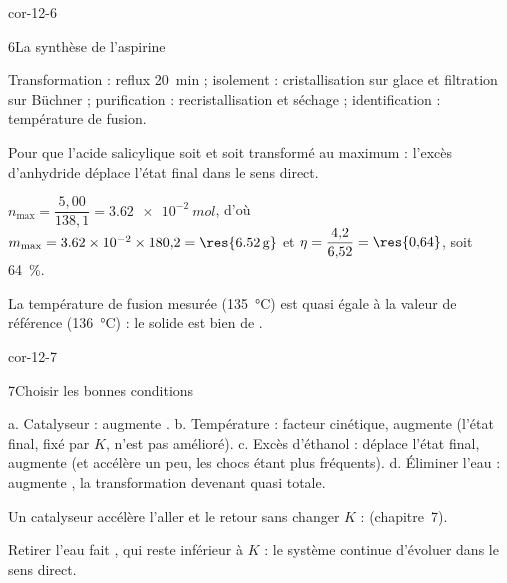 \begin{blocLivre}{cor-12-6}
\begin{corrige}{6}{La synthèse de l'aspirine}
\begin{questions}
\item Transformation : reflux 20~min ; isolement : cristallisation sur glace et filtration sur Büchner ;
purification : recristallisation et séchage ; identification : température de fusion.
\item Pour que l'acide salicylique soit  et soit transformé au maximum : l'excès d'anhydride
déplace l'état final dans le sens direct.
\item $n_{\max}=\dfrac{5{,}00}{138{,}1}=\qty{3,62e-2}{mol}$, d'où
$m_{\max}=\num{3.62e-2}\times180{,}2=\res{\qty{6,52}{g}}$ et $\eta=\dfrac{4{,}2}{6{,}52}=\res{0{,}64}$, soit 64~\%.
\item La température de fusion mesurée (135~°C) est quasi égale à la valeur de référence (136~°C) : le solide est bien
de .
\end{questions}
\end{corrige}
\end{blocLivre}
\begin{blocLivre}{cor-12-7}
\begin{corrige}{7}{Choisir les bonnes conditions}
\begin{questions}
\item a. Catalyseur : augmente . b. Température : facteur cinétique, augmente
 (l'état final, fixé par $K$, n'est pas amélioré). c. Excès d'éthanol : déplace l'état final,
augmente  (et accélère un peu, les chocs étant plus fréquents). d. Éliminer l'eau : augmente
, la transformation devenant quasi totale.
\item Un catalyseur accélère l'aller et le retour sans changer $K$ : 
(chapitre~7).
\item Retirer l'eau fait , qui reste inférieur à $K$ : le système continue d'évoluer
dans le sens direct.
\end{questions}
\end{corrige}
\end{blocLivre}

